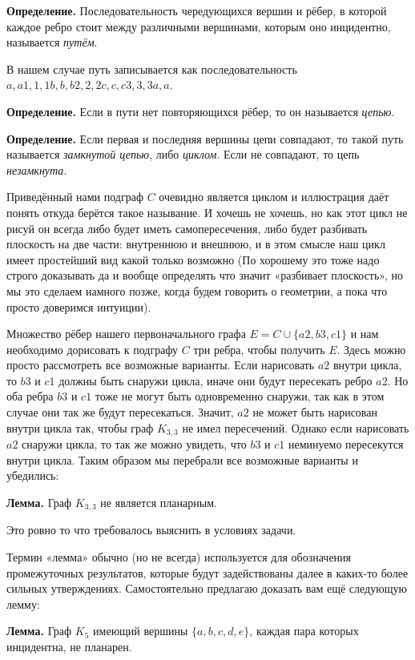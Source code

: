 {\bfseries Определение.} Последовательность чередующихся вершин и рёбер, в которой каждое ребро стоит между различными вершинами, которым оно инцидентно, называется {\slshape путём}.

В нашем случае путь записывается как последовательность $a, a1, 1, 1b, b, b2, 2, 2c, c, c3, 3, 3a, a$.

{\bfseries Определение.} Если в пути нет повторяющихся рёбер, то он называется {\slshape цепью}.

{\bfseries Определение.} Если первая и последняя вершины цепи совпадают, то такой путь называется {\slshape замкнутой цепью}, либо {\slshape циклом}. Если не совпадают, то цепь {\slshape незамкнута}.

Приведённый нами подграф $C$ очевидно является циклом и иллюстрация даёт понять откуда берётся такое называние. И хочешь не хочешь, но как этот цикл не рисуй он всегда либо будет иметь самопересечения, либо будет разбивать плоскость на две части: внутреннюю и внешнюю, и в этом смысле наш цикл имеет простейший вид какой только возможно (По хорошему это тоже надо строго доказывать да и вообще определять что значит «разбивает плоскость», но мы это сделаем намного позже, когда будем говорить о геометрии, а пока что просто доверимся интуиции).

Множество рёбер нашего первоначального графа $E = C \cup \{a2, b3, c1\}$ и нам необходимо дорисовать к подграфу $C$ три ребра, чтобы получить $E$. Здесь можно просто рассмотреть все возможные варианты. Если нарисовать $a2$ внутри цикла, то $b3$ и $c 1$ должны быть снаружи цикла, иначе они будут пересекать ребро $a2$. Но оба ребра $b3$ и $c 1$ тоже не могут быть одновременно снаружи, так как в этом случае они так же будут пересекаться. Значит, $a2$ не может быть нарисован внутри цикла так, чтобы граф $K_{3, 3}$ не имел пересечений. Однако если нарисовать $a2$ снаружи цикла, то так же можно увидеть, что $b3$ и $c 1$ неминуемо пересекутся внутри цикла. Таким образом мы перебрали все возможные варианты и убедились:

{\bfseries Лемма.} Граф $K_{3, 3}$ не является планарным.

Это ровно то что требовалось выяснить в условиях задачи.

Термин «лемма» обычно (но не всегда) используется для обозначения промежуточных результатов, которые будут задействованы далее в каких-то более сильных утверждениях. Самостоятельно предлагаю доказать вам ещё следующую лемму:

{\bfseries Лемма.} Граф $K_5$ имеющий вершины $\{a, b, c, d, e\}$, каждая пара которых инцидентна, не планарен.

